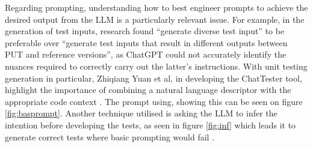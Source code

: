 Regarding prompting, understanding how to best engineer prompts to achieve the desired output from the LLM is a particularly relevant issue. For example, in the generation of test inputs, research found “generate diverse test input” to be preferable over “generate test inputs that result in different outputs between PUT and reference versions”, as ChatGPT could not accurately identify the nuances required to correctly carry out the latter's instructions. \citep{kn:nuances}
With unit testing generation in particular, Zhiqiang Yuan et al, in developing the ChatTester tool, highlight the importance of combining a natural language descriptor with the appropriate code context \citep{kn:chattester}. The prompt using, showing this can be seen on figure \ref{fig:basprompt}. Another technique utilised is asking the LLM to infer the intention before developing the tests, as seen in figure \ref{fig:inf} which leads it to generate correct tests where basic prompting would fail \citep{kn:chattester}.



